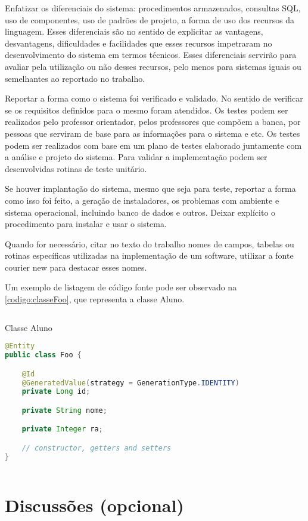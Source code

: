 Enfatizar os diferenciais do sistema: procedimentos armazenados, consultas SQL, uso de componentes, uso de padrões de projeto, a forma de uso dos recursos da linguagem. Esses diferenciais são no sentido de explicitar as vantagens, desvantagens, dificuldades e facilidades que esses recursos impetraram no desenvolvimento do sistema em termos técnicos. Esses diferenciais servirão para avaliar pela utilização ou não desses recursos, pelo menos para sistemas iguais ou semelhantes ao reportado no trabalho.

Reportar a forma como o sistema foi verificado e validado. No sentido de verificar se os requisitos definidos para o mesmo foram atendidos. Os testes podem ser realizados pelo professor orientador, pelos professores que compõem a banca, por pessoas que serviram de base para as informações para o sistema e etc. Os testes podem ser realizados com base em um plano de testes elaborado juntamente com a análise e projeto do sistema. Para validar a implementação podem ser desenvolvidas rotinas de teste unitário.

Se houver implantação do sistema, mesmo que seja para teste, reportar a forma como isso foi feito, a geração de instaladores, os problemas com ambiente e sistema operacional, incluindo banco de dados e outros. Deixar explícito o procedimento para instalar e usar o sistema.

Quando for necessário, citar no texto do trabalho nomes de campos, tabelas ou rotinas específicas utilizadas na implementação de um software, utilizar a fonte courier new para destacar esses nomes.

Um exemplo de listagem de código fonte pode ser observado na \autoref{codigo:classeFoo}, que representa a classe Aluno.

\begin{sourcecode}[htb]
  \caption{\label{codigo:classeFoo}Classe Aluno}
  \begin{lstlisting}[frame=single, language=Java]
@Entity
public class Foo {

    @Id
    @GeneratedValue(strategy = GenerationType.IDENTITY)
    private Long id;

    private String nome;

    private Integer ra;

    // constructor, getters and setters
}
\end{lstlisting}
  \fonte{}
\end{sourcecode}

\section{Discussões (opcional)}\label{sec:discussoes}


